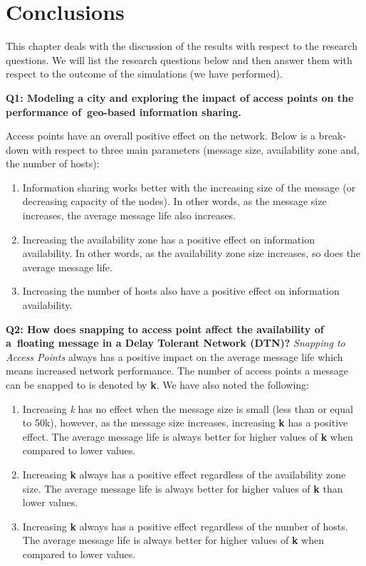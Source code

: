
\chapter{Conclusions}\label{chapter:conclusions}
This chapter deals with the discussion of the results with respect to the research questions. We will list the research questions below and then answer them with respect to the outcome of the simulations (we have performed).\newline

\textbf{Q1: Modeling a city and exploring the impact of access points on the performance of geo-based information sharing.} \newline

Access points have an overall positive effect on the network. Below is a break-down with respect to three main parameters (message size, availability zone and, the number of hosts):

\begin{enumerate}
  \item Information sharing works better with the increasing size of the message (or decreasing capacity of the nodes). In other words, as the message size increases, the average message life also increases.
  \item Increasing the availability zone has a positive effect on information availability. In other words, as the availability zone size increases, so does the average message life.
  \item Increasing the number of hosts also have a positive effect on information availability.
\end{enumerate}
\vspace{4mm}
\textbf{Q2: How does snapping to access point affect the availability of a floating message in a Delay Tolerant Network (DTN)?}\newline
\textit{Snapping to Access Points} always has a positive impact on the average message life which means increased network performance. The number of access points a message can be snapped to is denoted by \textbf{k}. We have also noted the following:
\begin{enumerate}
  \item Increasing \textit{k} has no effect when the message size is small (less than or equal to 50k), however, as the message size increases, increasing \textbf{k} has a positive effect. The average message life is always better for higher values of \textbf{k} when compared to lower values.
  \item Increasing \textbf{k} always has a positive effect regardless of the availability zone size. The average message life is always better for higher values of \textbf{k} than lower values.
  \item Increasing \textbf{k} always has a positive effect regardless of the number of hosts. The average message life is always better for higher values of \textbf{k} when compared to lower values.
\end{enumerate}
